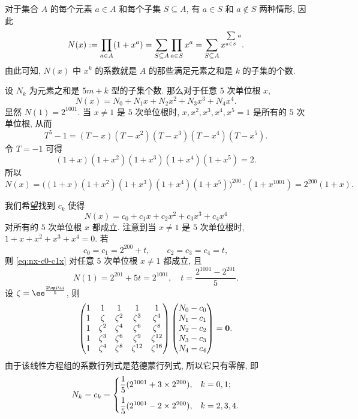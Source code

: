 \begin{solution}
  对于集合 $A$ 的每个元素 $a\in A$ 和每个子集 $S\subseteq A$, 有 $a\in S$ 和 $a\notin S$ 两种情形, 因此
  \[
    N(x):=\prod_{a\in A}(1+x^a)
    =\sum_{S\subseteq A}\prod_{a\in S}x^a
    =\sum_{S\subseteq A}x^{\sum\limits_{a\in S}a}.
  \]
  由此可知, $N(x)$ 中 $x^k$ 的系数就是 $A$ 的那些满足元素之和是 $k$ 的子集的个数.

  设 $N_k$ 为元素之和是 $5m+k$ 型的子集个数.
  那么对于任意 $5$ 次单位根 $x$,
  \[
    N(x)=N_0+N_1x+N_2x^2+N_3x^3+N_4x^4.
  \]
  显然 $N(1)=2^{1001}$.
  当 $x\neq 1$ 是 $5$ 次单位根时, $x,x^2,x^3,x^4,x^5=1$ 是所有的 $5$ 次单位根, 从而
  \[
    T^5-1=(T-x)(T-x^2)(T-x^3)(T-x^4)(T-x^5).
  \]
  令 $T=-1$ 可得
  \[
    (1+x)(1+x^2)(1+x^3)(1+x^4)(1+x^5)=2.
  \]
  所以
  \[
    N(x)=\bigl((1+x)(1+x^2)(1+x^3)(1+x^4)(1+x^5)\bigr)^{200}\cdot(1+x^{1001})
    =2^{200}(1+x).
  \]

  我们希望找到 $c_k$ 使得
  \begin{equation}
    \label{eq:nx-c0-c1x}
    N(x)=c_0+c_1x+c_2x^2+c_3x^3+c_4x^4
  \end{equation}
  对所有的 $5$ 次单位根 $x$ 都成立.
  注意到当 $x\neq 1$ 是 $5$ 次单位根时, $1+x+x^2+x^3+x^4=0$.
  若
  \[
    c_0=c_1=2^{200}+t,\qquad c_2=c_3=c_4=t,
  \]
  则 \ref{eq:nx-c0-c1x} 对任意 $5$ 次单位根 $x\neq 1$ 都成立, 且
  \[
    N(1)=2^{201}+5t=2^{1001},\quad
    t=\frac{2^{1001}-2^{201}}5.
  \]
  设 $\zeta=\ee^{\frac{2\cpi\ii}5}$, 则
  \[
    \begin{pmatrix}
      1&1&1&1&1\\
      1&\zeta&\zeta^2&\zeta^3&\zeta^4\\
      1&\zeta^2&\zeta^4&\zeta^6&\zeta^8\\
      1&\zeta^3&\zeta^6&\zeta^9&\zeta^{12}\\
      1&\zeta^4&\zeta^8&\zeta^{12}&\zeta^{16}
    \end{pmatrix}\begin{pmatrix}
      N_0-c_0\\
      N_1-c_1\\
      N_2-c_2\\
      N_3-c_3\\
      N_4-c_4
    \end{pmatrix}={\bf0}.
  \]
  由于该线性方程组的系数行列式是范德蒙行列式, 所以它只有零解, 即
  \[
    N_k=c_k=\begin{cases}
      \dfrac15(2^{1001}+3\times 2^{200}),&k=0,1;\\[2\itemsep]
      \dfrac15(2^{1001}-2\times 2^{200}),&k=2,3,4.
    \end{cases}
  \]
\end{solution}

